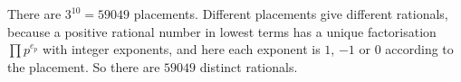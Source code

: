 There are $3^{10}=59049$ placements. Different placements give different rationals, because a positive rational number in lowest terms has a unique factorisation $\prod p^{e_p}$ with integer exponents, and here each exponent is $1$, $-1$ or $0$ according to the placement. So there are $\boxed{59049}$ distinct rationals.
